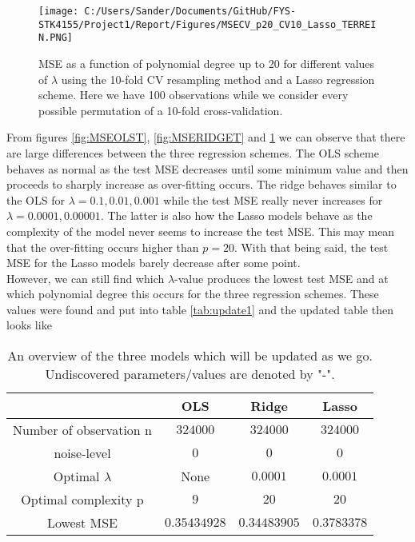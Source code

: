 \documentclass[12pt,a4paper]{article}
\begin{document}
\begin{figure}[H]
\centering
\texttt{[image: C:/Users/Sander/Documents/GitHub/FYS-STK4155/Project1/Report/Figures/MSECV\_p20\_CV10\_Lasso\_TERREIN.PNG]}
\caption{\label{fig:MSELASSOT} MSE as a function of polynomial degree up to 20 for different values of $\lambda$ using the 10-fold CV resampling method and a Lasso regression scheme. Here we have 100 observations while we consider every possible permutation of a 10-fold cross-validation.}
\end{figure}

\noindent From figures \ref{fig:MSEOLST}, \ref{fig:MSERIDGET} and \ref{fig:MSELASSOT} we can observe that there are large differences between the three regression schemes. The OLS scheme behaves as normal as the test MSE decreases until some minimum value and then proceeds to sharply increase as over-fitting occurs. The ridge behaves similar to the OLS for $\lambda = 0.1,0.01,0.001$ while the test MSE really never increases for $\lambda = 0.0001,0.00001$. The latter is also how the Lasso models behave as the complexity of the model never seems to increase the test MSE. This may mean that the over-fitting occurs higher than $p = 20$. With that being said, the test MSE for the Lasso models barely decrease after some point. 
\\
However, we can still find which $\lambda$-value produces the lowest test MSE and at which polynomial degree this occurs for the three regression schemes. These values were found and put into table \ref{tab:update1} and the updated table then looks like

\begin{table}[h]
\caption{\label{tab:update2} An overview of the three models which will be updated as we go. Undiscovered parameters/values are denoted by "-".}
\centering
\begin{tabular}{c|c|c|c}
 & OLS & Ridge & Lasso\\
\hline
Number of observation n & $324000$ & $324000$ & $324000$\\
\hline
noise-level & $0$ & $0$ & $0$\\
\hline
Optimal $\lambda$ & None & $0.0001$ & $0.0001$\\
\hline
Optimal complexity p & $9$ & $20$ & $20$\\
\hline
Lowest MSE & $0.35434928$ & $0.34483905$ & $0.3783378$\\
\end{tabular}
\end{table}
\end{document}
